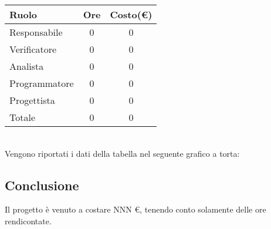 \begin{tabular}{|l|c|c|}
\hline
Ruolo & Ore & Costo(€)\\
\hline
Responsabile & 0 & 0\\
Verificatore & 0 & 0\\
Analista & 0 & 0\\
Programmatore & 0 & 0\\
Progettista & 0 & 0\\
Totale & 0& 0\\
\hline
\end{tabular}\\


Vengono riportati i dati della tabella nel seguente grafico a torta: \\



\subsection{Conclusione}
Il progetto è venuto a costare NNN €, tenendo conto solamente delle ore rendicontate.